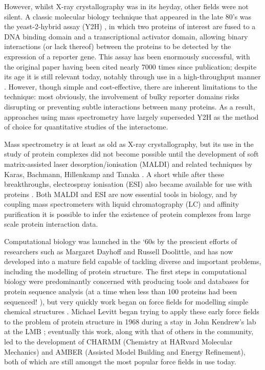 \documentclass[a4paper,11pt,twoside,openright]{scrbook}
\begin{document}
However, whilst X-ray crystallography was in its heyday, other fields were not
silent. A classic molecular biology technique that appeared in the late 80's was
the yeast-2-hybrid assay (Y2H) \cite{Fields1989}, in which two proteins of
interest are fused to a DNA binding domain and a transcriptional activator
domain, allowing binary interactions (or lack thereof) between the proteins to
be detected by the expression of a reporter gene. This assay has been enormously
successful, with the original paper having been cited nearly 7000 times since
publication; despite its age it is still relevant today, notably through use in
a high-throughput manner \cite{Rajagopala2014}. However, though simple and
cost-effective, there are inherent limitations to the technique: most obviously,
the involvement of bulky reporter domains risks disrupting or preventing subtle
interactions between many proteins. As a result, approaches using mass
spectrometry have largely superseded Y2H as the method of choice for
quantitative studies of the interactome.

Mass spectrometry is at least as old as X-ray crystallography, but its use in
the study of protein complexes did not become possible until the development of
soft matrix-assisted laser desorption/ionisation (MALDI) and related techniques
by Karas, Bachmann, Hillenkamp and Tanaka \cite{Karas1985,Tanaka1988}. A short
while after these breakthroughs, electrospray ionisation (ESI) also became
available for use with proteins \cite{Fenn1989}. Both MALDI and ESI are now
essential tools in biology, and by coupling mass spectrometers with liquid
chromatography (LC) and affinity purification it is possible to infer the
existence of protein complexes from large scale protein interaction data.

Computational biology was launched in the `60s by the prescient efforts of
researchers such as Margaret Dayhoff and Russell Doolittle, and has now
developed into a mature field capable of tackling diverse and important
problems, including the modelling of protein structure. The first steps in
computational biology were predominantly concerned with producing tools and
databases for protein sequence analysis (at a time when less than 100 proteins
had been sequenced! \cite{Dayhoff1965}), but very quickly work began on force
fields for modelling simple chemical structures \cite{Bixon1967}. Michael Levitt
began trying to apply these early force fields to the problem of protein
structure in 1968 during a stay in John Kendrew's lab at the LMB
\cite{Levitt2001}; eventually this work, along with that of others in the
community, led to the development of CHARMM \cite{Brooks2009} (Chemistry at
HARvard Molecular Mechanics) and AMBER \cite{Salomon-Ferrer2013,Amber2017}
(Assisted Model Building and Energy Refinement), both of which are still amongst
the most popular force fields in use today.
\end{document}
